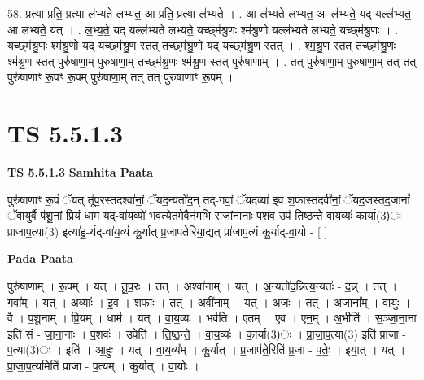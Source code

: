 \documentclass[17pt]{extarticle}
\begin{document}
58. प्रत्या प्रति॒ प्रत्या ल॑भ्यते लभ्यत॒ आ प्रति॒ प्रत्या ल॑भ्यते । . आ ल॑भ्यते लभ्यत॒ आ ल॑भ्यते॒ यद् यल्ल॑भ्यत॒ आ ल॑भ्यते॒ यत् । . ल॒भ्य॒ते॒ यद् यल्ल॑भ्यते लभ्यते॒ यच्छ्म॑श्रु॒णः श्म॑श्रु॒णो यल्ल॑भ्यते लभ्यते॒ यच्छ्म॑श्रु॒णः । . यच्छ्म॑श्रु॒णः श्म॑श्रु॒णो यद् यच्छ्म॑श्रु॒ण स्तत् तच्छ्म॑श्रु॒णो यद् यच्छ्म॑श्रु॒ण स्तत् । . श्म॒श्रु॒ण स्तत् तच्छ्म॑श्रु॒णः श्म॑श्रु॒ण स्तत् पुरु॑षाणा॒म् पुरु॑षाणा॒म् तच्छ्म॑श्रु॒णः श्म॑श्रु॒ण स्तत् पुरु॑षाणाम् । . तत् पुरु॑षाणा॒म् पुरु॑षाणा॒म् तत् तत् पुरु॑षाणाꣳ रू॒पꣳ रू॒पम् पुरु॑षाणा॒म् तत् तत् पुरु॑षाणाꣳ रू॒पम् । \newline
\pagebreak
{}

\section{ TS 5.5.1.3 }

\textbf{TS 5.5.1.3 } \newline
\textbf{Samhita Paata} \newline

पुरु॑षाणाꣳ रू॒पं ॅयत् तू॑प॒रस्तदश्वा॑नां॒ ॅयद॒न्यतो॑द॒न् तद्-गवां॒ ॅयदव्या॑ इव श॒फास्तदवी॑नां॒ ॅयद॒जस्तद॒जानां᳚ ॅवा॒युर्वै प॑शू॒नां प्रि॒यं धाम॒ यद्-वा॑य॒व्यो॑ भव॑त्ये॒तमे॒वैन॑म॒भि स॑जांना॒नाः प॒शव॒ उप॑ तिष्ठन्ते वाय॒व्यः॑ का॒र्या(3)ः प्रा॑जाप॒त्या(3) इत्या॑हु॒-र्यद्-वा॑य॒व्यं॑ कु॒र्यात् प्र॒जाप॑तेरिया॒द्यत् प्रा॑जाप॒त्यं कु॒र्याद्-वा॒यो - [  ] \newline

\textbf{Pada Paata} \newline

पुरु॑षाणाम् । रू॒पम् । यत् । तू॒प॒रः । तत् । अश्वा॑नाम् । यत् । अ॒न्यतो॑द॒न्नित्य॒न्यतः॑ - द॒न्न् । तत् । गवा᳚म् । यत् । अव्याः᳚ । इ॒व॒ । श॒फाः । तत् । अवी॑नाम् । यत् । अ॒जः । तत् । अ॒जाना᳚म् । वा॒युः । वै । प॒शू॒नाम् । प्रि॒यम् । धाम॑ । यत् । वा॒य॒व्यः॑ । भव॑ति । ए॒तम् । ए॒व । ए॒न॒म् । अ॒भीति॑ । स॒ञ्जा॒ना॒ना इति॑ सं - जा॒ना॒नाः । प॒शवः॑ । उपेति॑ । ति॒ष्ठ॒न्ते॒ । वा॒य॒व्यः॑ । का॒र्या(3)ः । प्रा॒जा॒प॒त्या(3) इति॑ प्राजा - प॒त्या(3)ः । इति॑ । आ॒हुः॒ । यत् । वा॒य॒व्य᳚म् । कु॒र्यात् । प्र॒जाप॑ते॒रिति॑ प्र॒जा - प॒तेः॒ । इ॒या॒त् । यत् । प्रा॒जा॒प॒त्यमिति॑ प्राजा - प॒त्यम् । कु॒र्यात् । वा॒योः ।  \newline
\end{document}
